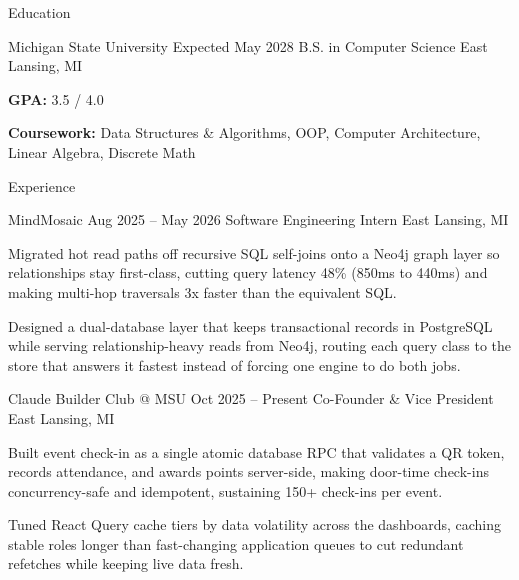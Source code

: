 \documentclass[
	11pt
]{../../../template}
\begin{document}
	\begin{rSection}{E}{ducation}
		\begin{rSectionEntry}
			{Michigan State University}
			{Expected May 2028}
			{B.S. in Computer Science}
			{}
			{East Lansing, MI}

			\item \textbf{GPA:} 3.5 / 4.0
			\item \textbf{Coursework:} Data Structures \& Algorithms, OOP, Computer Architecture, Linear Algebra, Discrete Math
		\end{rSectionEntry}
	\end{rSection}

	\begin{rSection}{E}{xperience}
		\begin{rSectionEntry}
			{MindMosaic}
			{Aug 2025 -- May 2026}
			{Software Engineering Intern}
			{}
			{East Lansing, MI}

			\item Migrated hot read paths off recursive SQL self-joins onto a Neo4j graph layer so relationships stay first-class, cutting query latency 48\% (850ms to 440ms) and making multi-hop traversals 3x faster than the equivalent SQL.
			\item Designed a dual-database layer that keeps transactional records in PostgreSQL while serving relationship-heavy reads from Neo4j, routing each query class to the store that answers it fastest instead of forcing one engine to do both jobs.
		\end{rSectionEntry}

		\begin{rSectionEntry}
			{Claude Builder Club @ MSU}
			{Oct 2025 -- Present}
			{Co-Founder \& Vice President}
			{}
			{East Lansing, MI}

			\item Built event check-in as a single atomic database RPC that validates a QR token, records attendance, and awards points server-side, making door-time check-ins concurrency-safe and idempotent, sustaining 150+ check-ins per event.
			\item Tuned React Query cache tiers by data volatility across the dashboards, caching stable roles longer than fast-changing application queues to cut redundant refetches while keeping live data fresh.
		\end{rSectionEntry}


\end{rSection}
\end{document}

